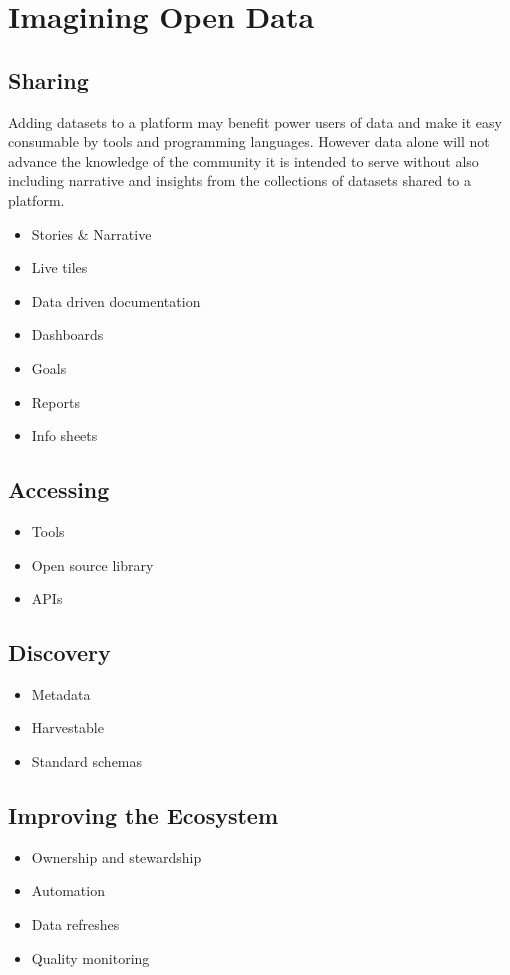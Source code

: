 \documentclass[
  openany]{book}
\providecommand{\tightlist}{%
  \setlength{\itemsep}{0pt}\setlength{\parskip}{0pt}}
\begin{document}
\hypertarget{imagine}{%
\chapter{Imagining Open Data}\label{imagine}}

\hypertarget{sharing}{%
\section{Sharing}\label{sharing}}

Adding datasets to a platform may benefit power users of data and make it easy consumable by tools and programming languages. However data alone will not advance the knowledge of the community it is intended to serve without also including narrative and insights from the collections of datasets shared to a platform.

\begin{itemize}
\tightlist
\item
  Stories \& Narrative
\item
  Live tiles
\item
  Data driven documentation
\item
  Dashboards
\item
  Goals
\item
  Reports
\item
  Info sheets
\end{itemize}

\hypertarget{accessing}{%
\section{Accessing}\label{accessing}}

\begin{itemize}
\tightlist
\item
  Tools
\item
  Open source library
\item
  APIs
\end{itemize}

\hypertarget{discovery}{%
\section{Discovery}\label{discovery}}

\begin{itemize}
\tightlist
\item
  Metadata
\item
  Harvestable
\item
  Standard schemas
\end{itemize}

\hypertarget{improving-the-ecosystem}{%
\section{Improving the Ecosystem}\label{improving-the-ecosystem}}

\begin{itemize}
\tightlist
\item
  Ownership and stewardship
\item
  Automation
\item
  Data refreshes
\item
  Quality monitoring
\end{itemize}

  
\end{document}
